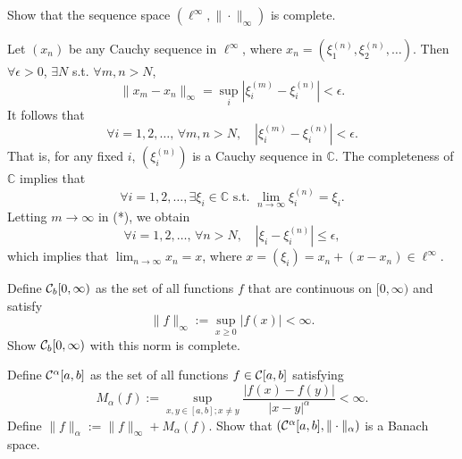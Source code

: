 \begin{exc}
  \label{exc:ellInftyComplete}
  Show that the sequence space
  $(\ell^{\infty}, \|\cdot\|_{\infty})$ is complete.
\end{exc}
\begin{solution}
  Let $(x_n)$ be any Cauchy sequence in $\ell^{\infty}$,
  where $x_n = \left( \xi_1^{(n)}, \xi_2^{(n)}, \ldots \right)$.
  Then $\forall \epsilon > 0$,
  $\exists N$
  s.t. $\forall m, n > N$,
  \begin{equation*}
    \|x_m - x_n\|_{\infty} = \sup_i \left| \xi_i^{(m)} - \xi_i^{(n)} \right| < \epsilon.
  \end{equation*}
  It follows that
  \begin{equation*}
    \tag{*}
    \forall i = 1, 2, \ldots, \,
    \forall m, n > N, \quad
    \left| \xi_i^{(m)} - \xi_i^{(n)} \right| < \epsilon.
  \end{equation*}
  That is,
  for any fixed $i$,
  $\left( \xi_i^{(n)} \right)$ is a Cauchy sequence in $\mathbb{C}$.
  The completeness of $\mathbb{C}$ implies that
  \begin{equation*}
    \forall i = 1, 2, \ldots,
    \exists \xi_i \in \mathbb{C}
    \text{ s.t. }
    \lim_{n\rightarrow\infty}\xi_i^{(n)} = \xi_i.
  \end{equation*}
  Letting $m\rightarrow\infty$ in (*),
  we obtain
  \begin{equation*}
    \forall i=1, 2, \ldots, \,
    \forall n > N, \quad
    \left| \xi_i - \xi_i^{(n)} \right| \le \epsilon,
  \end{equation*}
  which implies that
  $\lim_{n\rightarrow\infty}x_n = x$,
  where $x = (\xi_i) = x_n + (x - x_n)\in \ell^{\infty}$.
\end{solution}

\begin{exc}
  Define ${\cal C}_b[0,\infty)$ as the set of all functions
  $f$ that are continuous on $[0,\infty)$
  and satisfy
  \begin{displaymath}
    \|f\|_{\infty} := \sup_{x\ge 0}|f(x)| < \infty.
  \end{displaymath}
  Show ${\cal C}_b[0,\infty)$ with this norm is complete.
\end{exc}

\begin{exc}
  Define ${\cal C}^{\alpha}[a,b]$ as the set of all functions
  $f\in {\cal C}[a,b]$ satisfying
  \begin{displaymath}
    M_{\alpha}(f) := \sup_{x,y\in[a,b]; x\ne y}
    \frac{|f(x)-f(y)|}{|x-y|^{\alpha}} < \infty.
  \end{displaymath}
  Define $\|f\|_{\alpha} := \|f\|_{\infty}+M_{\alpha}(f)$.
  Show that $({\cal C}^{\alpha}[a,b], \|\cdot\|_{\alpha})$
  is a Banach space.
\end{exc}

